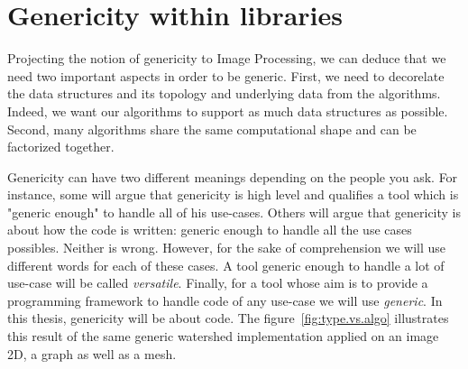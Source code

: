 \section{Genericity within libraries}
\label{sec:gen.within.libraries}

Projecting the notion of genericity to Image Processing, we can deduce that we need two important aspects in order to be
generic. First, we need to decorelate the data structures and its topology and underlying data from the algorithms.
Indeed, we want our algorithms to support as much data structures as possible. Second, many algorithms share the same
computational shape and can be factorized together.

Genericity can have two different meanings depending on the people you ask. For instance, some will argue that
genericity is high level and qualifies a tool which is "generic enough" to handle all of his use-cases. Others will
argue that genericity is about how the code is written: generic enough to handle all the use cases possibles. Neither is
wrong. However, for the sake of comprehension we will use different words for each of these cases. A tool generic enough
to handle a lot of use-case will be called \emph{versatile}. Finally, for a tool whose aim is to provide a programming
framework to handle code of any use-case we will use \emph{generic}. In this thesis, genericity will be about code. The
figure~\ref{fig:type.vs.algo} illustrates this result of the same generic watershed implementation applied on an image
2D, a graph as well as a mesh.

